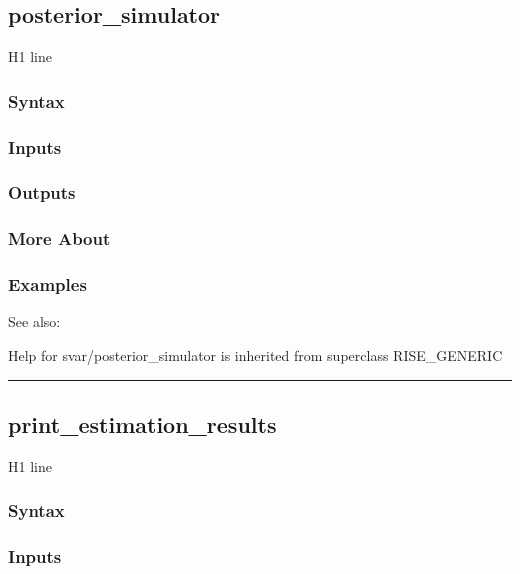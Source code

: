 \documentclass[letterpaper,10pt,english]{sphinxmanual}
\begin{document}
\subsection{posterior\_simulator}
\label{classes/models/@svar/svar:posterior-simulator}\label{classes/models/@svar/svar:id76}
H1 line


\subsubsection{Syntax}
\label{classes/models/@svar/svar:id77}

\subsubsection{Inputs}
\label{classes/models/@svar/svar:id78}

\subsubsection{Outputs}
\label{classes/models/@svar/svar:id79}

\subsubsection{More About}
\label{classes/models/@svar/svar:id80}

\subsubsection{Examples}
\label{classes/models/@svar/svar:id81}
See also:

Help for svar/posterior\_simulator is inherited from superclass RISE\_GENERIC


\bigskip\hrule{}\bigskip



\subsection{print\_estimation\_results}
\label{classes/models/@svar/svar:id82}\label{classes/models/@svar/svar:print-estimation-results}
H1 line


\subsubsection{Syntax}
\label{classes/models/@svar/svar:id83}

\subsubsection{Inputs}
\label{classes/models/@svar/svar:id84}
\end{document}
